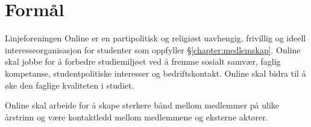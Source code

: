 \chapter{Formål}

Linjeforeningen Online er en partipolitisk og religiøst uavhengig, frivillig og ideell interesseorganisasjon for studenter som oppfyller §\ref{chapter:medlemskap}. Online skal jobbe for å forbedre studiemiljøet ved å fremme sosialt samvær, faglig kompetanse, studentpolitiske interesser og bedriftskontakt. Online skal bidra til å øke den faglige kvaliteten i studiet.

Online skal arbeide for å skape sterkere bånd mellom medlemmer på ulike årstrinn og være kontaktledd mellom medlemmene og eksterne aktører. 
